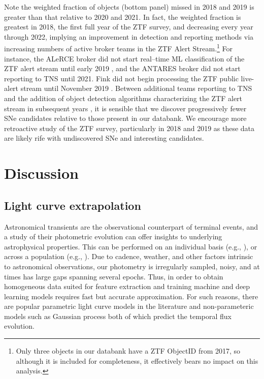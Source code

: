 \documentclass[twocolumn]{aastex63}
\begin{document}
Note the weighted fraction of objects (bottom panel) missed in 2018 and 2019 is greater than that relative to 2020 and 2021. In fact, the weighted fraction is greatest in 2018, the first full year of the ZTF survey, and decreasing every year through 2022, implying an improvement in detection and reporting methods via increasing numbers of active broker teams in the ZTF Alert Stream.\footnote{Only three objects in our databank have a ZTF ObjectID from 2017, so although it is included for completeness, it effectively bears no impact on this analysis.} For instance, the ALeRCE broker did not start real–time ML classification of the ZTF alert stream until early 2019 \citep{Forster2021}, and the ANTARES broker did not start reporting to TNS until 2021. Fink did not begin processing the ZTF public live-alert stream until November 2019 \citep{Moller2021}. Between additional teams reporting to TNS and the addition of object detection algorithms characterizing the ZTF alert stream in subsequent years \citep[e.g.,][]{Muthukrishna2019,Andreoni2021, Duev2021,vanRoestel2021,Coughlin2021,Forster2021,SanchezSaez2021,Carrasco-Davis2021,Leoni2022,Aleo2022,Reyes-Jainaga2023}, it is sensible that we discover progressively fewer SNe candidates relative to those present in our databank. We encourage more retroactive study of the ZTF survey, particularly in 2018 and 2019 as these data are likely rife with undiscovered SNe and interesting candidates. \par


\section{Discussion} \label{sec:discussion}




\subsection{Light curve extrapolation} \label{subsec:lc_extrapolation}

Astronomical transients are the observational counterpart of terminal events, and a study of their photometric evolution can offer insights to underlying astrophysical properties. This can be performed on an individual basis (e.g., \citealt{Gagliano2021}), or across a population (e.g., \citealt{Nyholm2020}). Due to cadence, weather, and other factors intrinsic to astronomical observations, our photometry is irregularly sampled, noisy, and at times has large gaps spanning several epochs. Thus, in order to obtain homogeneous data suited for feature extraction and training machine and deep learning models requires fast but accurate approximation. For such reasons, there are popular parametric light curve models in the literature \citep{Bazin2009, Villar2019, Russeil2023} and non-parameteric models such as Gaussian process \citep[GP,][]{Boone2019,Demianenko2022} both of which predict the temporal flux evolution. \par
\end{document}

